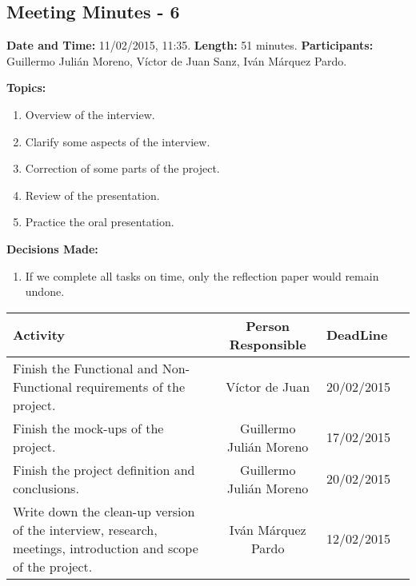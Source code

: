 \subsection{Meeting Minutes - 6}
\textbf{Date and Time:} 11/02/2015, 11:35. 
\textbf{Length:} 51 minutes. 
\textbf{Participants: } Guillermo Julián Moreno, Víctor de Juan Sanz, Iván Márquez Pardo.

\textbf{Topics: } 
\begin{enumerate}
\item Overview of the interview.
\item Clarify some aspects of the interview.
\item Correction of some parts of the project.
\item Review of the presentation.
\item Practice the oral presentation.
\end{enumerate}

\textbf{Decisions Made:}\\
\begin{enumerate}
\item If we complete all tasks on time, only the reflection paper would remain undone.
\end{enumerate}

\begin{tabular}{|p{5cm} c|p{5cm}|p{5cm}|}
\hline Activity & Person Responsible & DeadLine \\\hline
Finish the Functional and Non-Functional requirements of the project. & Víctor de Juan & 20/02/2015\\\hline

Finish the mock-ups of the project. & Guillermo Julián Moreno & 17/02/2015\\\hline

Finish the project definition and conclusions. & Guillermo Julián Moreno & 20/02/2015\\\hline

Write down the clean-up version of the interview, research, meetings, introduction and scope of the project. & Iván Márquez Pardo & 12/02/2015\\\hline
\end{tabular}